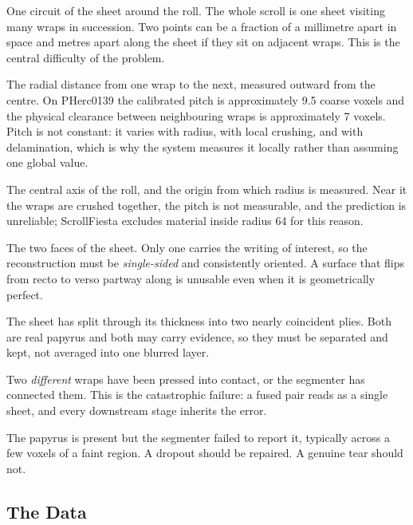 \begin{description}
  \setlength{\itemsep}{2pt}
  \item[Wrap (turn).] One circuit of the sheet around the roll. The whole scroll is one sheet visiting many wraps in succession. Two points can be a fraction of a millimetre apart in space and metres apart along the sheet if they sit on adjacent wraps. This is the central difficulty of the problem.
  \item[Pitch.] The radial distance from one wrap to the next, measured outward from the centre. On PHerc0139 the calibrated pitch is approximately 9.5 coarse voxels and the physical clearance between neighbouring wraps is approximately 7 voxels. Pitch is not constant: it varies with radius, with local crushing, and with delamination, which is why the system measures it locally rather than assuming one global value.
  \item[Umbilicus.] The central axis of the roll, and the origin from which radius is measured. Near it the wraps are crushed together, the pitch is not measurable, and the prediction is unreliable; ScrollFiesta excludes material inside radius 64 for this reason.
  \item[Recto and verso.] The two faces of the sheet. Only one carries the writing of interest, so the reconstruction must be \emph{single-sided} and consistently oriented. A surface that flips from recto to verso partway along is unusable even when it is geometrically perfect.
  \item[Delamination.] The sheet has split through its thickness into two nearly coincident plies. Both are real papyrus and both may carry evidence, so they must be separated and kept, not averaged into one blurred layer.
  \item[Fusion.] Two \emph{different} wraps have been pressed into contact, or the segmenter has connected them. This is the catastrophic failure: a fused pair reads as a single sheet, and every downstream stage inherits the error.
  \item[Dropout.] The papyrus is present but the segmenter failed to report it, typically across a few voxels of a faint region. A dropout should be repaired. A genuine tear should not.
\end{description}

\subsection{The Data}
\label{sec:data}


